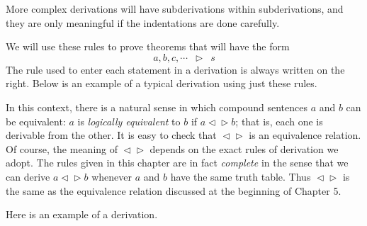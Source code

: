\documentclass{article}
\newcommand{\0}{\mathbf 0}
\newcommand{\1}{\mathbf 1}
\newcommand{\der}{\vartriangleright}
\newcommand{\red}{\vartriangleleft}
\begin{document}
More complex derivations will have subderivations within subderivations, and they are only meaningful if the indentations are done carefully.

We will use these rules to prove theorems that will have the form
\begin{equation*}
a,b,c,\cdots \enspace \der \enspace s
\end{equation*}
The rule used to enter each statement in a derivation is always written on the right. Below is an example of a typical derivation using just these rules.

In this context, there is a natural sense in which compound sentences $a$ and $b$ can be equivalent: $a$ is \emph{logically equivalent} to $b$ if $a \red \der b$; that is, each one is derivable from the other. It is easy to check that $\red \der$ is an equivalence relation. Of course, the meaning of $\red \der$ depends on the exact rules of derivation we adopt. The rules given in this chapter are in fact \emph{complete} in the sense that we can derive $a \red \der b$ whenever $a$ and $b$ have the same truth table. Thus $\red \der$ is the same as the equivalence relation discussed at the beginning of Chapter 5.

Here is an example of a derivation.
\end{document}

